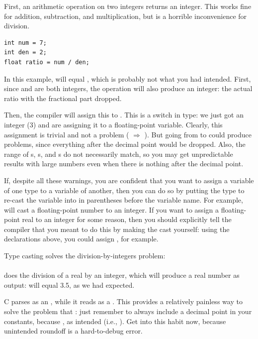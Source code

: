 First, an arithmetic operation on two integers returns an integer. This works fine for
addition, subtraction, and multiplication, but is a horrible inconvenience for division.\\
\begin{lstlisting}
int num = 7;
int den = 2;
float ratio = num / den;
\end{lstlisting}
In this example,  will equal , which is probably not what you had intended. 
First, since  and  are both integers, the operation
 will also produce an integer: the actual ratio with the
fractional part dropped.

Then, the compiler will assign this to . This is a
switch in type: we just got an integer (3) and are assigning it to
a floating-point variable. Clearly, this assignment is trivial and
not a problem ( $\Rightarrow$ ).  But going from
 to  could produce problems, since everything after the decimal point
would be dropped.  Also, the range of s, s,
and s do not necessarily match, so you may get unpredictable
results with large numbers even when there is nothing after the decimal
point.

If, despite all these warnings, you are confident that you want to
assign a variable of one type to a variable of another, then you can
do so by putting the type to re-cast the variable into in parentheses
before the variable name. For example,  will
cast a floating-point number to an integer.  If you want to assign
a floating-point real to an integer for some reason, then you should
explicitly tell the compiler that you meant to do this by making the cast
yourself: using the declarations above, you could assign , for example.

Type casting solves the division-by-integers problem: \\
\\
does the division of a real by an integer, which will produce a real
number as output:  will equal 3.5, as we had expected.

C parses  as an , while it reads 
as a . This provides a relatively painless way to solve
the problem that : just remember to always include
a decimal point in your constants, because ,
as intended (i.e., ). Get into this
habit now, because unintended roundoff is a hard-to-debug error.

